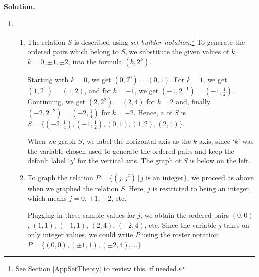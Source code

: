 \documentclass{ximera}
\begin{document}
\begin{example}
\begin{enumerate}
\begin{multicols}{2}
\begin{enumerate}
\setcounter{HW}{\value{enumii}}
\end{enumerate}
\end{multicols}

\end{enumerate}

{\bf Solution.}  

\begin{enumerate}

\item \begin{enumerate}

\item The relation $S$ is described using  \textit{set-builder notation}.\footnote{See Section \ref{AppSetTheory} to review this, if needed.}  To generate the ordered pairs  which belong to $S$, we substitute the given values of $k$, $k = 0, \pm 1, \pm 2$, into the formula $\left(k, 2^{k}\right)$. 

\smallskip

 Starting with $k=0$, we get $\left(0, 2^{0} \right) = (0,1)$.  For $k = 1$, we get $\left(1, 2^{1} \right) = (1,2)$, and for $k = -1$, we get $\left(-1, 2^{-1} \right) = \left(-1,\frac{1}{2} \right)$.  Continuing, we get  $\left(2, 2^{2} \right) = (2,4)$ for $k = 2$  and, finally $\left(-2, 2^{-2} \right) = \left(-2,\frac{1}{4} \right)$ for $k = -2$.  Hence, a  of $S$ is  $S = \{  \left(-2,\frac{1}{4} \right),  \left(-1,\frac{1}{2} \right),  \left(0,1 \right),  \left(1,2 \right),  \left(2,4 \right)\}$. 
 
 \smallskip
 
  When we graph $S$, we label the horizontal axis as the $k$-axis, since `$k$' was the variable chosen used to generate the ordered pairs and keep the default label `$y$' for the vertical axis. The graph of $S$ is below on the left.

\item  To graph the relation $P = \{ \left(j, j^2\right) \, | \, \text{$j$ is an integer} \}$, we proceed as above when we graphed the relation $S$.  Here, $j$ is restricted to being an integer, which means $j = 0$, $\pm 1$, $\pm 2$, etc.  

\smallskip

Plugging in these sample values for $j$, we obtain the ordered pairs $(0,0)$, $(1, 1)$, $(-1,1)$, $(2,4)$, $(-2,4)$, etc.  Since the variable $j$ takes on only integer values,  we could write $P$ using the roster notation: $P = \{ (0,0), (\pm 1, 1), (\pm 2, 4), \dots \}$.   


\end{enumerate}
\end{enumerate}
\end{example}
\end{document}
